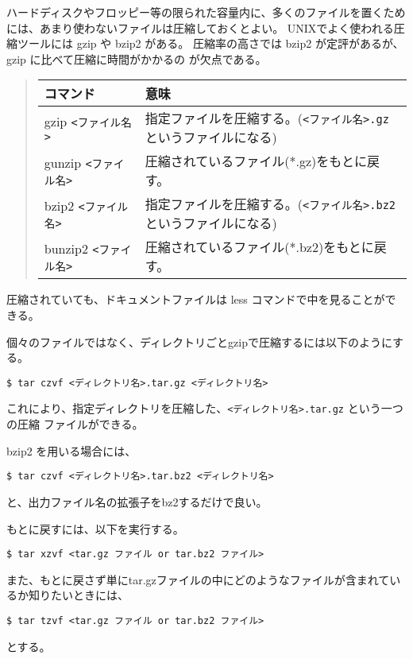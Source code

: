 \documentclass{jreport}
\begin{document}
ハードディスクやフロッピー等の限られた容量内に、多くのファイルを置くため
には、あまり使わないファイルは圧縮しておくとよい。
UNIXでよく使われる圧縮ツールには gzip や bzip2 がある。
圧縮率の高さでは bzip2 が定評があるが、gzip に比べて圧縮に時間がかかるの
が欠点である。

\begin{quote}
\begin{tabular}[t]{ll}\hline
コマンド & 意味 \\ \hline
gzip \verb|<ファイル名>| & 指定ファイルを圧縮する。(\verb|<ファイル名>.gz| というファイルになる)\\
gunzip \verb|<ファイル名>| & 圧縮されているファイル(*.gz)をもとに戻す。\\
bzip2 \verb|<ファイル名>| & 指定ファイルを圧縮する。(\verb|<ファイル名>.bz2| というファイルになる)\\
bunzip2 \verb|<ファイル名>| & 圧縮されているファイル(*.bz2)をもとに戻す。\\
\hline
\end{tabular}
\end{quote}

圧縮されていても、ドキュメントファイルは less コマンドで中を見ることがで
きる。

個々のファイルではなく、ディレクトリごとgzipで圧縮するには以下のようにする。
\begin{screen}
\begin{verbatim}
$ tar czvf <ディレクトリ名>.tar.gz <ディレクトリ名>
\end{verbatim}
\end{screen}
これにより、指定ディレクトリを圧縮した、\verb|<ディレクトリ名>.tar.gz| という一つの圧縮
ファイルができる。

bzip2 を用いる場合には、
\begin{screen}
\begin{verbatim}
$ tar czvf <ディレクトリ名>.tar.bz2 <ディレクトリ名>
\end{verbatim}
\end{screen}
と、出力ファイル名の拡張子をbz2するだけで良い。

もとに戻すには、以下を実行する。
\begin{screen}
\begin{verbatim}
$ tar xzvf <tar.gz ファイル or tar.bz2 ファイル>
\end{verbatim}
\end{screen}
また、もとに戻さず単にtar.gzファイルの中にどのようなファイルが含まれてい
るか知りたいときには、
\begin{screen}
\begin{verbatim}
$ tar tzvf <tar.gz ファイル or tar.bz2 ファイル>
\end{verbatim}
\end{screen}
とする。
\end{document}
